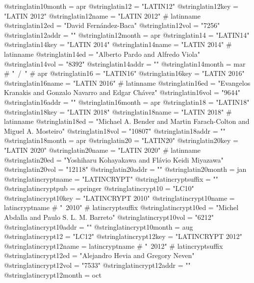 @string{latin10month =          apr}
@string{latin12 =               "LATIN12"}
@string{latin12key =            "LATIN 2012"}
@string{latin12name =           "LATIN 2012" # latinname}
@string{latin12ed =             "David Fern{\'a}ndez-Baca"}
@string{latin12vol =            "7256"}
@string{latin12addr =           ""}
@string{latin12month =          apr}
@string{latin14 =               "LATIN14"}
@string{latin14key =            "LATIN 2014"}
@string{latin14name =           "LATIN 2014" # latinname}
@string{latin14ed =             "Alberto Pardo and Alfredo Viola"}
@string{latin14vol =            "8392"}
@string{latin14addr =           ""}
@string{latin14month =          mar # "~/~" # apr}
@string{latin16 =               "LATIN16"}
@string{latin16key =            "LATIN 2016"}
@string{latin16name =           "LATIN 2016" # latinname}
@string{latin16ed =             "Evangelos Kranakis and Gonzalo Navarro and Edgar Ch{\'a}vez"}
@string{latin16vol =            "9644"}
@string{latin16addr =           ""}
@string{latin16month =          apr}
@string{latin18 =               "LATIN18"}
@string{latin18key =            "LATIN 2018"}
@string{latin18name =           "LATIN 2018" # latinname}
@string{latin18ed =             "Michael A. Bender and  Martin {Farach-Colton} and  Miguel A. Mosteiro"}
@string{latin18vol =            "10807"}
@string{latin18addr =           ""}
@string{latin18month =          apr}
@string{latin20 =               "LATIN20"}
@string{latin20key =            "LATIN 2020"}
@string{latin20name =           "LATIN 2020" # latinname}
@string{latin20ed =             "Yoshiharu Kohayakawa and Fl{\'a}vio Keidi Miyazawa"}
@string{latin20vol =            "12118"}
@string{latin20addr =           ""}
@string{latin20month =          jan}
@string{latincryptname =        "{LATINCRYPT}"}
@string{latincryptsuffix =      ""}
@string{latincryptpub =         springer}
@string{latincrypt10 =          "LC10"}
@string{latincrypt10key =       "LATINCRYPT 2010"}
@string{latincrypt10name =      latincryptname # "~2010" # latincryptsuffix}
@string{latincrypt10ed =        "Michel Abdalla and Paulo S. L. M. Barreto"}
@string{latincrypt10vol =       "6212"}
@string{latincrypt10addr =      ""}
@string{latincrypt10month =     aug}
@string{latincrypt12 =          "LC12"}
@string{latincrypt12key =       "LATINCRYPT 2012"}
@string{latincrypt12name =      latincryptname # "~2012" # latincryptsuffix}
@string{latincrypt12ed =        "Alejandro Hevia and Gregory Neven"}
@string{latincrypt12vol =       "7533"}
@string{latincrypt12addr =      ""}
@string{latincrypt12month =     oct}
